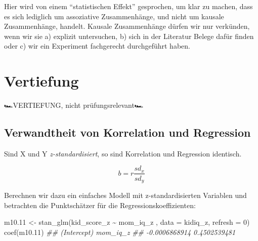 \documentclass[
  a4paper,
  DIV=11]{scrreprt}
\newenvironment{Shaded}{\begin{snugshade}}{\end{snugshade}}
\newcommand{\AttributeTok}[1]{\textcolor[rgb]{0.40,0.45,0.13}{#1}}
\newcommand{\DecValTok}[1]{\textcolor[rgb]{0.68,0.00,0.00}{#1}}
\newcommand{\DocumentationTok}[1]{\textcolor[rgb]{0.37,0.37,0.37}{\textit{#1}}}
\newcommand{\FloatTok}[1]{\textcolor[rgb]{0.68,0.00,0.00}{#1}}
\newcommand{\FunctionTok}[1]{\textcolor[rgb]{0.28,0.35,0.67}{#1}}
\newcommand{\NormalTok}[1]{\textcolor[rgb]{0.00,0.23,0.31}{#1}}
\newcommand{\OtherTok}[1]{\textcolor[rgb]{0.00,0.23,0.31}{#1}}
\newcommand{\SpecialCharTok}[1]{\textcolor[rgb]{0.37,0.37,0.37}{#1}}
\theoremstyle{definition}
\theoremstyle{remark}
\begin{document}
\begin{tcolorbox}[enhanced jigsaw, title=\textcolor{quarto-callout-important-color}{\faExclamation}\hspace{0.5em}{Wichtig}, bottomtitle=1mm, bottomrule=.15mm, titlerule=0mm, colbacktitle=quarto-callout-important-color!10!white, colframe=quarto-callout-important-color-frame, leftrule=.75mm, left=2mm, toprule=.15mm, colback=white, arc=.35mm, breakable, toptitle=1mm, opacityback=0, rightrule=.15mm, coltitle=black, opacitybacktitle=0.6]

Hier wird von einem ``statistischen Effekt'' gesprochen, um klar zu
machen, dass es sich lediglich um assoziative Zusammenhänge, und nicht
um kausale Zusammenhänge, handelt. Kausale Zusammenhänge dürfen wir nur
verkünden, wenn wir sie a) explizit untersuchen, b) sich in der
Literatur Belege dafür finden oder c) wir ein Experiment fachgerecht
durchgeführt haben.

\end{tcolorbox}

\hypertarget{vertiefung-2}{%
\section{Vertiefung}\label{vertiefung-2}}

🏎️VERTIEFUNG, nicht prüfungsrelevant🏎️

\hypertarget{verwandtheit-von-korrelation-und-regression}{%
\subsection{Verwandtheit von Korrelation und
Regression}\label{verwandtheit-von-korrelation-und-regression}}

Sind X und Y \emph{z-standardisiert}, so sind Korrelation und Regression
identisch.

\[b = r \frac{sd_x}{sd_y}\]

Berechnen wir dazu ein einfaches Modell mit z-standardisierten Variablen
und betrachten die Punktschätzer für die Regressionskoeffizienten:

\begin{Shaded}
\begin{Highlighting}[]
\NormalTok{m10}\FloatTok{.11} \OtherTok{\textless{}{-}} 
  \FunctionTok{stan\_glm}\NormalTok{(kid\_score\_z }\SpecialCharTok{\textasciitilde{}}\NormalTok{ mom\_iq\_z , }\AttributeTok{data =}\NormalTok{ kidiq\_z, }\AttributeTok{refresh =} \DecValTok{0}\NormalTok{)}
\FunctionTok{coef}\NormalTok{(m10}\FloatTok{.11}\NormalTok{)}
\DocumentationTok{\#\#   (Intercept)      mom\_iq\_z }
\DocumentationTok{\#\# {-}0.0006868914  0.4502539481}
\end{Highlighting}
\end{Shaded}
\end{document}
